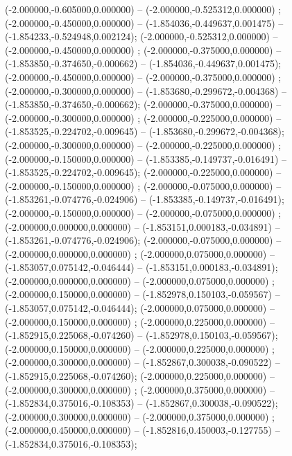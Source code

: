  (-2.000000,-0.605000,0.000000) -- (-2.000000,-0.525312,0.000000) ;
 (-2.000000,-0.450000,0.000000) -- (-1.854036,-0.449637,0.001475) -- (-1.854233,-0.524948,0.002124);
 (-2.000000,-0.525312,0.000000) -- (-2.000000,-0.450000,0.000000) ;
 (-2.000000,-0.375000,0.000000) -- (-1.853850,-0.374650,-0.000662) -- (-1.854036,-0.449637,0.001475);
 (-2.000000,-0.450000,0.000000) -- (-2.000000,-0.375000,0.000000) ;
 (-2.000000,-0.300000,0.000000) -- (-1.853680,-0.299672,-0.004368) -- (-1.853850,-0.374650,-0.000662);
 (-2.000000,-0.375000,0.000000) -- (-2.000000,-0.300000,0.000000) ;
 (-2.000000,-0.225000,0.000000) -- (-1.853525,-0.224702,-0.009645) -- (-1.853680,-0.299672,-0.004368);
 (-2.000000,-0.300000,0.000000) -- (-2.000000,-0.225000,0.000000) ;
 (-2.000000,-0.150000,0.000000) -- (-1.853385,-0.149737,-0.016491) -- (-1.853525,-0.224702,-0.009645);
 (-2.000000,-0.225000,0.000000) -- (-2.000000,-0.150000,0.000000) ;
 (-2.000000,-0.075000,0.000000) -- (-1.853261,-0.074776,-0.024906) -- (-1.853385,-0.149737,-0.016491);
 (-2.000000,-0.150000,0.000000) -- (-2.000000,-0.075000,0.000000) ;
 (-2.000000,0.000000,0.000000) -- (-1.853151,0.000183,-0.034891) -- (-1.853261,-0.074776,-0.024906);
 (-2.000000,-0.075000,0.000000) -- (-2.000000,0.000000,0.000000) ;
 (-2.000000,0.075000,0.000000) -- (-1.853057,0.075142,-0.046444) -- (-1.853151,0.000183,-0.034891);
 (-2.000000,0.000000,0.000000) -- (-2.000000,0.075000,0.000000) ;
 (-2.000000,0.150000,0.000000) -- (-1.852978,0.150103,-0.059567) -- (-1.853057,0.075142,-0.046444);
 (-2.000000,0.075000,0.000000) -- (-2.000000,0.150000,0.000000) ;
 (-2.000000,0.225000,0.000000) -- (-1.852915,0.225068,-0.074260) -- (-1.852978,0.150103,-0.059567);
 (-2.000000,0.150000,0.000000) -- (-2.000000,0.225000,0.000000) ;
 (-2.000000,0.300000,0.000000) -- (-1.852867,0.300038,-0.090522) -- (-1.852915,0.225068,-0.074260);
 (-2.000000,0.225000,0.000000) -- (-2.000000,0.300000,0.000000) ;
 (-2.000000,0.375000,0.000000) -- (-1.852834,0.375016,-0.108353) -- (-1.852867,0.300038,-0.090522);
 (-2.000000,0.300000,0.000000) -- (-2.000000,0.375000,0.000000) ;
 (-2.000000,0.450000,0.000000) -- (-1.852816,0.450003,-0.127755) -- (-1.852834,0.375016,-0.108353);
